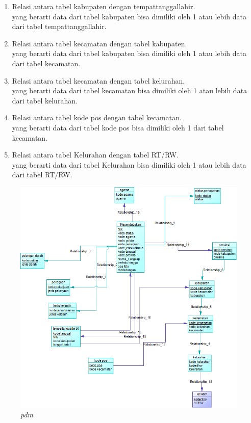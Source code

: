 \documentclass[12pt,a4paper,bahasa]{article}
\begin{document}
\begin{enumerate}
\item Relasi antara tabel kabupaten dengan tempattanggallahir.\\
yang berarti data dari tabel kabupaten bisa dimiliki oleh 1 atau lebih data dari tabel tempattanggallahir.\\

\item Relasi antara tabel kecamatan dengan tabel kabupaten.\\
yang berarti data dari tabel kabupaten bisa dimiliki oleh 1 atau lebih data dari tabel kecamatan.\\

\item Relasi antara tabel kecamatan dengan tabel kelurahan.\\
yang berarti data dari tabel kecamatan bisa dimiliki oleh 1 atau lebih data dari tabel kelurahan.\\

\item Relasi antara tabel kode pos dengan tabel kecamatan.\\
yang berarti data dari tabel kode pos bisa dimiliki oleh 1 dari tabel kecamatan.\\

\item Relasi antara tabel Kelurahan dengan tabel RT/RW.\\
yang berarti data dari tabel Kelurahan bisa dimiliki oleh 1 atau lebih data dari tabel RT/RW.\\
\end{enumerate}


\begin{figure}[!htbp]
\centering
\includegraphics[scale=1.2]{gambar/pdm.png}
\caption{\textit{pdm}}
\label{pdm}
\end{figure}	
\end{document}
